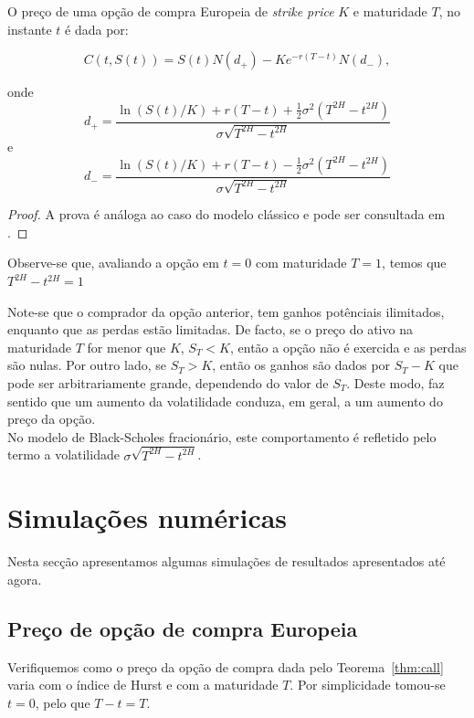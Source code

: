 \documentclass{article}
\begin{document}
\vspace{1cm}


\begin{thm}\label{thm:call}
    O preço de uma opção de compra Europeia de \textit{strike price} $K$ e maturidade $T$, no instante $t$ é dada por:

    $$C(t,S(t))=S(t)N(d_+)-Ke^{-r(T-t)}N(d_-),$$

    onde $$d_+=\frac{\ln(S(t)/K)+r(T-t)+\frac{1}{2}\sigma^2(T^{2H}-t^{2H})}{\sigma \sqrt{T^{2H}-t^{2H}}}$$
    \hspace{0.5cm} e    $$d_-=\frac{\ln(S(t)/K)+r(T-t)-\frac{1}{2}\sigma^2(T^{2H}-t^{2H})}{\sigma \sqrt{T^{2H}-t^{2H}}}$$
\end{thm}
\begin{proof}
    A prova é análoga ao caso do modelo  clássico e pode ser consultada em \cite{Inkaya2011}.
\end{proof}

\vspace{0.5cm}

Observe-se que, avaliando a opção em $t=0$ com maturidade $T=1$, temos que $T^{2H}-t^{2H}=1$

\vspace{0.5cm}

Note-se que o comprador da opção anterior, tem ganhos potênciais ilimitados, enquanto que as perdas estão limitadas. De facto, se o preço do ativo na maturidade $T$ for menor que $K$, $S_T<K$, então a opção não é exercida e as perdas são nulas. Por outro lado, se $S_T>K$, então os ganhos são dados por $S_T-K$ que pode ser arbitrariamente grande, dependendo do valor de $S_T$. Deste modo, faz sentido que um aumento da volatilidade conduza, em geral, a um aumento do preço da opção.\\

No modelo de Black-Scholes fracionário, este comportamento é refletido pelo termo a volatilidade $\sigma \sqrt{T^{2H}-t^{2H}}$.

\vspace{2cm}

\section{Simulações numéricas}
Nesta secção apresentamos algumas simulações de resultados apresentados até agora.

\vspace{0.5cm}

\subsection{Preço de opção de compra Europeia}
Verifiquemos como o preço da opção de compra dada pelo Teorema~\ref{thm:call} varia com o índice de Hurst e com a maturidade $T$. Por simplicidade tomou-se $t=0$, pelo que  $T-t=T$.
\end{document}
